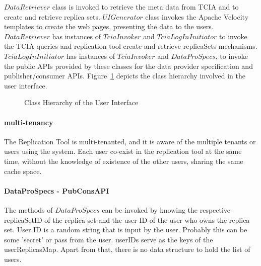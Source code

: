 \documentclass[conference]{IEEEtran}
\begin{document}
$DataRetriever$ class is invoked to retrieve the meta data from TCIA and to create and retrieve replica sets. $UIGenerator$ class invokes the Apache Velocity templates to create the web pages, presenting the data to the users. $DataRetriever$ has instances of $TciaInvoker$ and $TciaLogInInitiator$ to invoke the TCIA queries and replication tool create and retrieve replicaSets mechanisms. $TciaLogInInitiator$ has instances of $TciaInvoker$ and $DataProSpecs$, to invoke the public APIs provided by these classes for the data provider specification and publisher/consumer APIs. Figure~\ref{fig:classUX} depicts the class hierarchy involved in the user interface.
\begin{figure}[!htbp]
\begin{center}
\end{center}
 \caption{Class Hierarchy of the User Interface}
 \label{fig:classUX}
\end{figure}


\paragraph*{multi-tenancy}
The Replication Tool is multi-tenanted, and it is aware of the multiple tenants or users using the system. Each user co-exist in the replication tool at the same time, without the knowledge of existence of the other users, sharing the same cache space. 

\paragraph*{DataProSpecs - PubConsAPI}
The methods of $DataProSpecs$ can be invoked by knowing the respective replicaSetID of the replica set and the user ID of the user who owns the replica set. User ID is a random string that is input by the user. Probably this can be some 'secret' or pass from the user. userIDs serve as the keys of the userReplicasMap. Apart from that, there is no data structure to hold the list of users.
\end{document}
